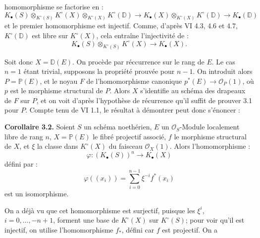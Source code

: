homomorphisme se factorise en :
\[
K_\bullet(S)\otimes_{K^\circ(S)}K^\circ(X)\otimes_{K^\circ(X)}K^\circ(\mathbb D)
\longrightarrow K_\bullet(X)\otimes_{K^\circ(X)}K^\circ(\mathbb D)
\longrightarrow K_\bullet(\mathbb D)
\]
et le premier homomorphisme est injectif. Comme, d'après VI 4.3, 4.6 et 4.7, $K^\circ(\mathbb D)$ est libre sur $K^\circ(X)$, cela entraîne l'injectivité de :
\[
K_\bullet(S)\otimes_{K^\circ(S)}K^\circ(X)\to K_\bullet(X).
\]

Soit donc $X=\mathbb D(E)$. On procède par réccurrence sur le rang de $E$. Le cas $n=1$ étant trivial, supposons la propriété prouvée pour $n-1$. On introduit alors $P=\mathbb P(E)$, et le noyau $F$ de l'homomorphisme canonique $p^*(E)\to \mathcal O_P(1)$, où $p$ est le morphisme structural de $P$. Alors $X$ s'identifie au schéma des drapeaux de $F$ sur $P$, et on voit d'après l'hypothèse de récurrence qu'il suffit de prouver 3.1 pour $P$. Compte tenu de VI 1.1, le résultat à démontrer peut donc s'énoncer :

\textbf{Corollaire 3.2.} Soient $S$ un schéma noethérien, $E$ un $\mathcal O_S$-Module localement libre de rang $n$, $X=\mathbb P(E)$ le fibré projectif associé, $f$ le morphisme structural de $X$, et $\xi$ la classe dans $K^\circ(X)$ du faisceau $\mathcal O_X(1)$. Alors l'homomorphisme :
\[
\varphi:(K_\bullet(S))^n\longrightarrow K_\bullet(X)
\]
défini par :
\[
\varphi((x_i))=\sum_{i=0}^{n-1}\xi^{-i}f^*(x_i)
\]
est un isomorphisme.

On a déjà vu que cet homomorphisme est surjectif, puisque les $\xi^i$, $i=0,\ldots,-n+1$, forment une base de $K^\circ(X)$ sur $K^\circ(S)$; pour voir qu'il est injectif, on utilise l'homomorphisme $f_*$, défini car $f$ est projectif. On a
